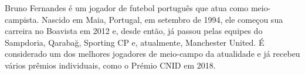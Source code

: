 \documentclass{article}
\begin{document}
    Bruno Fernandes é um jogador de futebol português que atua como meio-campista. Nascido em Maia, Portugal, em setembro de 1994, ele começou sua carreira no Boavista em 2012 e, desde então, já passou pelas equipes do Sampdoria, Qarabağ, Sporting CP e, atualmente, Manchester United. É considerado um dos melhores jogadores de meio-campo da atualidade e já recebeu vários prêmios individuais, como o Prémio CNID em 2018.
  
\end{document}
